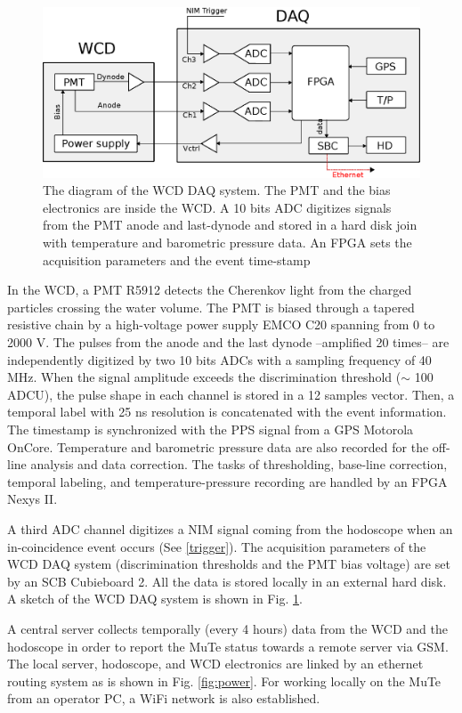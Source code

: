 \documentclass[letterpaper,11pt]{article}
\begin{document}
\begin{figure}[htb]
\centering
\includegraphics[width=0.9\columnwidth]{Figures/WCDDAQ.eps}
\caption{The diagram of the WCD DAQ system. The PMT and the bias electronics are inside the WCD. A 10 bits ADC digitizes signals from the PMT anode and last-dynode and stored in a hard disk join with temperature and barometric pressure data. An FPGA sets the acquisition parameters and the event time-stamp}
  \label{fig:WCD}
\end{figure}

In the WCD, a PMT R5912 detects the Cherenkov light from the charged particles crossing the water volume. The PMT is biased through a tapered resistive chain by a high-voltage power supply EMCO C20 spanning from 0 to 2000 V. The pulses from the anode and the last dynode --amplified 20 times-- are independently digitized by two 10 bits ADCs with a sampling frequency of 40 MHz. When the signal amplitude exceeds the discrimination threshold ($\sim$ 100 ADCU), the pulse shape in each channel is stored in a 12 samples vector. Then, a temporal label with 25 ns resolution is concatenated with the event information. The timestamp is synchronized with the PPS signal from a GPS Motorola OnCore. Temperature and barometric pressure data are also recorded for the off-line analysis and data correction. The tasks of thresholding, base-line correction, temporal labeling, and temperature-pressure recording are handled by an FPGA Nexys II.

A third ADC channel digitizes a NIM signal coming from the hodoscope when an in-coincidence event occurs (See \ref{trigger}). The acquisition parameters of the WCD DAQ system (discrimination thresholds and the PMT bias voltage) are set by an SCB Cubieboard 2. All the data is stored locally in an external hard disk. A sketch of the WCD DAQ system is shown in Fig. \ref{fig:WCD}. 

A central server collects temporally (every 4 hours) data from the WCD and the hodoscope in order to report the MuTe status towards a remote server via GSM. The local server, hodoscope, and WCD electronics are linked by an ethernet routing system as is shown in Fig. \ref{fig:power}. For working locally on the MuTe from an operator PC, a WiFi network is also established.
\end{document}
